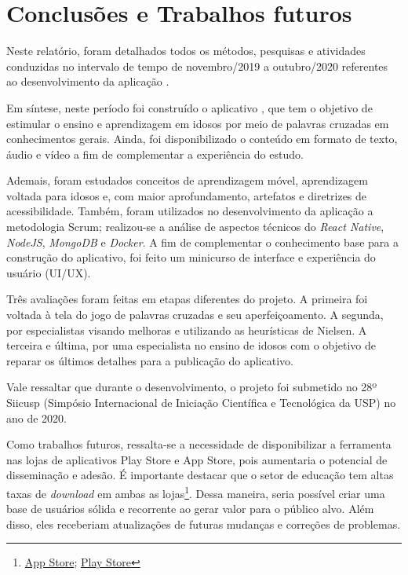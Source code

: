 \chapter{Conclusões e Trabalhos futuros} \label{sec:conclusao}
Neste relatório, foram detalhados todos os métodos, pesquisas e atividades conduzidas no intervalo de tempo de novembro/2019 a outubro/2020 referentes ao desenvolvimento da aplicação \crossword.

Em síntese, neste período foi construído o aplicativo \crossword, que tem o objetivo de estimular o ensino e aprendizagem em idosos por meio de palavras cruzadas em conhecimentos gerais. Ainda, foi disponibilizado o conteúdo em formato de texto, áudio e vídeo a fim de complementar a experiência do estudo.

Ademais, foram estudados conceitos de aprendizagem móvel, aprendizagem voltada para idosos e, com maior aprofundamento, artefatos e diretrizes de acessibilidade. Também, foram utilizados no desenvolvimento da aplicação \crossword a metodologia Scrum; realizou-se a análise de aspectos técnicos do \textit{React Native}, \textit{NodeJS}, \textit{MongoDB} e \textit{Docker}. A fim de complementar o conhecimento base para a construção do aplicativo, foi feito um minicurso de interface e experiência do usuário (UI/UX).

Três avaliações foram feitas em etapas diferentes do projeto. A primeira foi voltada à tela do jogo de palavras cruzadas e seu aperfeiçoamento. A segunda, por especialistas visando melhoras e utilizando as heurísticas de Nielsen. A terceira e última, por uma especialista no ensino de idosos com o objetivo de reparar os últimos detalhes para a publicação do aplicativo.

Vale ressaltar que durante o desenvolvimento, o projeto foi submetido no 28º Siicusp (Simpósio Internacional de Iniciação Científica e Tecnológica da USP) no ano de 2020.

Como trabalhos futuros, ressalta-se a necessidade de  disponibilizar a ferramenta nas lojas de aplicativos Play Store e App Store, pois aumentaria o potencial de disseminação e adesão. É importante destacar que o setor de educação tem altas taxas de \textit{download} em ambas as lojas\footnote{\href{https://www.statista.com/statistics/270291/popular-categories-in-the-app-store/}{App Store};  \href{https://www.statista.com/statistics/279286/google-play-android-app-categories/}{Play Store}}. Dessa maneira, seria possível criar uma base de usuários sólida e recorrente ao gerar valor para o público alvo. Além disso, eles receberiam atualizações de futuras mudanças e correções de problemas.


